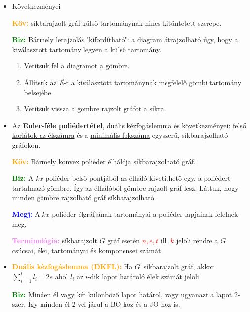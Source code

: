 \documentclass[../../szobeli.tex]{subfiles}
\begin{document}
\begin{itemize}
        \item Következményei

            \textcolor{orange}{\textbf{Köv:}} síkbarajzolt gráf külső tartománynak nincs kitüntetett szerepe.

            \textcolor{green}{\textbf{Biz:}} Bármely lerajzolás "kifordítható": a diagram átrajzolható úgy, hogy a kiválasztott tartomány legyen a külső tartomány.

            \begin{enumerate}
                \item Vetítsük fel a diagramot a gömbre.
                \item Állítsuk az \textit{É}-t a kiválasztott tartománynak megfelelő gömbi tartomány belsejébe.
                \item Vetítsük vissza a gömbre rajzolt gráfot a síkra. 
            \end{enumerate}

        \item Az \underline{\textbf{Euler-féle poliédertétel}, duális kézfogáslemma} és következményei: \underline{felső korlátok az élszámra} és a \underline{minimális fokszáma} egyszerű, síkbarajzolható gráfokon.

            \textcolor{orange}{\textbf{Köv:}} Bármely konvex poliéder élhálója síkbarajzolható gráf.

            \textcolor{green}{\textbf{Biz:}} A $kx$ poliéder belső pontjából az élháló kivetíthető egy, a poliédert tartalmazó gömbre. Így az élhálóból gömbre rajzolt gráf lesz. Láttuk, hogy minden gömbre rajzolható gráf síkbarajzolható. 

            \textcolor{blue}{\textbf{Megj:}} A $kx$ poliéder élgráfjának tartományai a poliéder lapjainak felelnek meg.

            \textcolor{violet}{\textbf{Terminológia:}} síkbarajzolt $G$ gráf esetén \textcolor{red}{$n, e, t$} ill. \textcolor{red}{$k$} jelöli rendre a $G$ csúcsai, élei, tartományai és komponensei számát.

        \item 

            \textcolor{orange}{\textbf{Duális kézfogáslemma (DKFL):}} Ha $G$ síkbarajzolt gráf, akkor $\sum_{i=1}^{t} l_i=2e$ ahol $l_i$ az $i$-dik lapot határoló élek számát jelöli.

            \textcolor{green}{\textbf{Biz:}} Minden él vagy két különböző lapot határol, vagy ugyanazt a lapot 2-szer. Így minden él 2-vel járul a BO-hoz és a JO-hoz is. 


\end{itemize}
\end{document}
